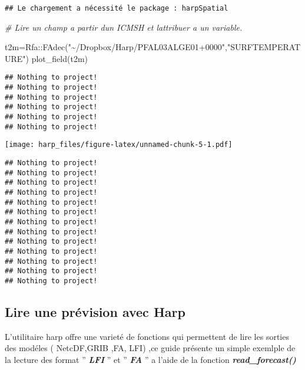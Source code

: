 \documentclass[
]{article}
\newenvironment{Shaded}{\begin{snugshade}}{\end{snugshade}}
\newcommand{\CommentTok}[1]{\textcolor[rgb]{0.56,0.35,0.01}{\textit{#1}}}
\newcommand{\FunctionTok}[1]{\textcolor[rgb]{0.00,0.00,0.00}{#1}}
\newcommand{\NormalTok}[1]{#1}
\newcommand{\OtherTok}[1]{\textcolor[rgb]{0.56,0.35,0.01}{#1}}
\newcommand{\SpecialCharTok}[1]{\textcolor[rgb]{0.00,0.00,0.00}{#1}}
\newcommand{\StringTok}[1]{\textcolor[rgb]{0.31,0.60,0.02}{#1}}
\begin{document}
\begin{verbatim}
## Le chargement a nécessité le package : harpSpatial
\end{verbatim}

\begin{Shaded}
\begin{Highlighting}[]
\CommentTok{\# Lire un champ a partir d\textquotesingle{}un ICMSH et l\textquotesingle{}attribuer a un variable. }

\NormalTok{t2m}\OtherTok{=}\NormalTok{Rfa}\SpecialCharTok{::}\FunctionTok{FAdec}\NormalTok{(}\StringTok{"\textasciitilde{}/Dropbox/Harp/PFAL03ALGE01+0000"}\NormalTok{,}\StringTok{"SURFTEMPERATURE"}\NormalTok{)}
\FunctionTok{plot\_field}\NormalTok{(t2m)}
\end{Highlighting}
\end{Shaded}

\begin{verbatim}
## Nothing to project!
## Nothing to project!
## Nothing to project!
## Nothing to project!
## Nothing to project!
## Nothing to project!
\end{verbatim}

\texttt{[image: harp\_files/figure-latex/unnamed-chunk-5-1.pdf]}

\begin{verbatim}
## Nothing to project!
## Nothing to project!
## Nothing to project!
## Nothing to project!
## Nothing to project!
## Nothing to project!
## Nothing to project!
## Nothing to project!
## Nothing to project!
## Nothing to project!
## Nothing to project!
## Nothing to project!
## Nothing to project!
\end{verbatim}

\hypertarget{lire-une-pruxe9vision-avec-harp}{%
\subsection{Lire une prévision avec
Harp}\label{lire-une-pruxe9vision-avec-harp}}

L'utilitaire harp offre une varieté de fonctions qui permettent de lire
les sorties des modéles ( NetcDF,GRIB ,FA, LFI) ,ce guide présente un
simple exemlple de la lecture des format '' \textbf{\emph{LFI}} '' et ''
\textbf{\emph{FA}} '' a l'aide de la fonction
\textbf{\emph{read\_forecast()}}
\end{document}

